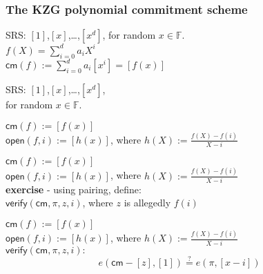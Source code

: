 \documentclass[shadesubsections,trans,14pt,mathserif]{beamer}
\newcommand{\F}{\ensuremath{\mathbb F}}
\newcommand{\enc}[1]{\ensuremath{\left[#1\right ]}}
\newcommand{\cm}{\ensuremath{\mathsf{cm}}}
\newcommand{\open}[1]{\ensuremath{\mathsf{open}(#1)}}
\newcommand{\verify}[1]{\ensuremath{\mathsf{verify}(#1)}}
\newcommand{\defeq}{\ensuremath{:=}}
\begin{document}
\begin{frame}
  \frametitle{The KZG polynomial commitment scheme}   %
 SRS: \enc{1},\enc{x},\ldots,\enc{x^d}, for random $x\in \F$.\\
 \vspace{0.4in}
 $f(X) = \sum_{i=0}^d a_i X^i$\\
 \vspace{0.4in}
 $\cm(f)\defeq  \sum_{i=0}^d a_i \enc{x^i}=  \enc{f(x)}$\\
 \vspace{0.4in}
 
\end{frame}
\begin{frame}
 SRS: \enc{1},\enc{x},\ldots,\enc{x^d},\\
 for random $x\in \F$.
 \vspace{0.4in}
 
 $\cm(f)\defeq   \enc{f(x)}$\\
 \vspace{0.4in}
$\open{f,i}\defeq \enc{h(x)}$, where
$h(X)\defeq \frac{f(X)-f(i)}{X-i}$
 \vspace{0.4in}
 
\end{frame}


\begin{frame}
 $\cm(f)\defeq   \enc{f(x)}$\\
 \vspace{0.4in}
$\open{f,i}\defeq \enc{h(x)}$, where
 $h(X)\defeq \frac{f(X)-f(i)}{X-i}$\\
 \vspace{0.4in}
\textbf{exercise} - using pairing, define:\\
 \vspace{0.2in}
 $\verify{\cm,\pi,z,i}$,
 where $z$ is allegedly $f(i)$
 \end{frame}




\begin{frame}

 $\cm(f)\defeq   \enc{f(x)}$\\
 \vspace{0.4in}
$\open{f,i}\defeq \enc{h(x)}$, where
 $h(X)\defeq \frac{f(X)-f(i)}{X-i}$\\
 \vspace{0.4in}
 $\verify{\cm,\pi,z,i}:$
\[e(\cm-\enc{z},\enc{1}) \stackrel{?}{=} e(\pi, \enc{x-i})\]
\end{frame}
\end{document}

